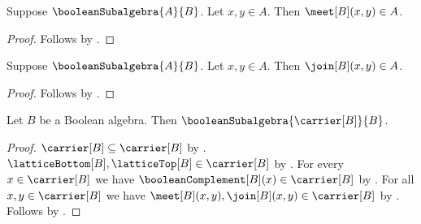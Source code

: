 \begin{proposition}\label{boolean_subalgebra_meet}
    Suppose $\booleanSubalgebra{A}{B}$.
    Let $x,y\in A$.
    Then $\meet[B](x,y)\in A$.
\end{proposition}
\begin{proof}
    Follows by .
\end{proof}

\begin{proposition}\label{boolean_subalgebra_join}
    Suppose $\booleanSubalgebra{A}{B}$.
    Let $x,y\in A$.
    Then $\join[B](x,y)\in A$.
\end{proposition}
\begin{proof}
    Follows by .
\end{proof}

\begin{proposition}\label{full_carrier_boolean_subalgebra}
    Let $B$ be a Boolean algebra.
    Then $\booleanSubalgebra{\carrier[B]}{B}$.
\end{proposition}
\begin{proof}
    $\carrier[B]\subseteq\carrier[B]$ by .
    $\latticeBottom[B],\latticeTop[B]\in\carrier[B]$ by
        .
    For every $x\in\carrier[B]$ we have
        $\booleanComplement[B](x)\in\carrier[B]$ by
        .
    For all $x,y\in\carrier[B]$ we have
        $\meet[B](x,y),\join[B](x,y)\in\carrier[B]$ by
        .
    Follows by .
\end{proof}

